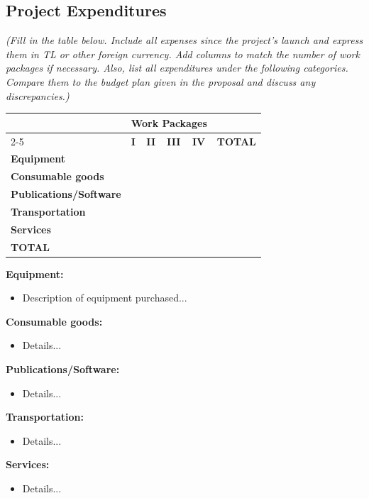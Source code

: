 \subsection{Project Expenditures}

\noindent \textit{(Fill in the table below. Include all expenses since the project's launch and express them in TL or other foreign currency. Add columns to match the number of work packages if necessary. Also, list all expenditures under the following categories. Compare them to the budget plan given in the proposal and discuss any discrepancies.)}

\vspace{1em}

\begin{table}[H]
\centering
\begin{tabularx}{\textwidth}{|l|X|X|X|X|c|}
\hline
\multicolumn{1}{|c|}{} & \multicolumn{4}{c|}{\textbf{Work Packages}} & \textbf{} \\ \cline{2-5}
\multicolumn{1}{|c|}{} & \centering\textbf{I} & \centering\textbf{II} & \centering\textbf{III} & \centering\textbf{IV} & \textbf{TOTAL} \\ \hline
\textbf{Equipment} & & & & & \\ \hline
\textbf{Consumable goods} & & & & & \\ \hline
\textbf{Publications/Software} & & & & & \\ \hline
\textbf{Transportation} & & & & & \\ \hline
\textbf{Services} & & & & & \\ \hline
\textbf{TOTAL} & & & & & \\ \hline
\end{tabularx}
\end{table}

\vspace{1em}

\noindent \textbf{Equipment:}
\begin{itemize}[label={}]
    \item Description of equipment purchased...
\end{itemize}
\vspace{1em}

\noindent \textbf{Consumable goods:}
\begin{itemize}[label={}]
    \item Details...
\end{itemize}
\vspace{1em}

\noindent \textbf{Publications/Software:}
\begin{itemize}[label={}]
    \item Details...
\end{itemize}
\vspace{1em}

\noindent \textbf{Transportation:}
\begin{itemize}[label={}]
    \item Details...
\end{itemize}
\vspace{1em}

\noindent \textbf{Services:}
\begin{itemize}[label={}]
    \item Details...
\end{itemize}
